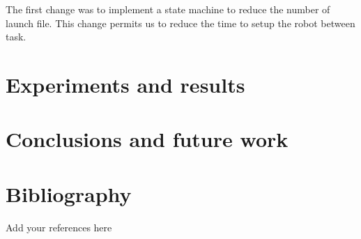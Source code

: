 \documentclass[runningheads,a4paper]{llncs}
\begin{document}
The first change was to implement a state machine to reduce the number of launch file. This change permits us to reduce the time to setup the robot between task. 



\section{Experiments and results}
\lipsum[15-20]

\section{Conclusions and future work}
\lipsum[21-24]

\section*{Bibliography}
Add your references here
%
%

\newpage

\end{document}
